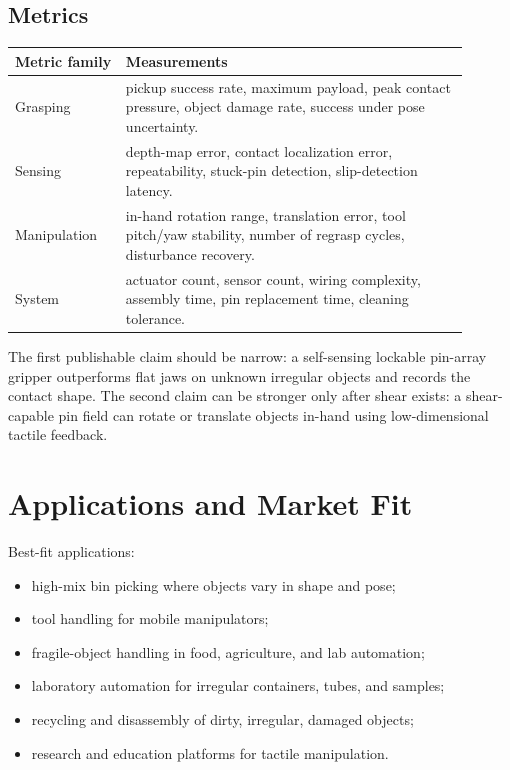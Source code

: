 \documentclass[11pt]{article}
\begin{document}
\subsection{Metrics}

\begin{longtable}{L{0.22\linewidth} L{0.68\linewidth}}
\toprule
\textbf{Metric family} & \textbf{Measurements} \\
\midrule
\endhead
Grasping & pickup success rate, maximum payload, peak contact pressure, object damage rate, success under pose uncertainty. \\
Sensing & depth-map error, contact localization error, repeatability, stuck-pin detection, slip-detection latency. \\
Manipulation & in-hand rotation range, translation error, tool pitch/yaw stability, number of regrasp cycles, disturbance recovery. \\
System & actuator count, sensor count, wiring complexity, assembly time, pin replacement time, cleaning tolerance. \\
\bottomrule
\end{longtable}

The first publishable claim should be narrow: a self-sensing lockable pin-array gripper outperforms flat jaws on unknown irregular objects and records the contact shape. The second claim can be stronger only after shear exists: a shear-capable pin field can rotate or translate objects in-hand using low-dimensional tactile feedback.

\section{Applications and Market Fit}

Best-fit applications:

\begin{itemize}
  \item high-mix bin picking where objects vary in shape and pose;
  \item tool handling for mobile manipulators;
  \item fragile-object handling in food, agriculture, and lab automation;
  \item laboratory automation for irregular containers, tubes, and samples;
  \item recycling and disassembly of dirty, irregular, damaged objects;
  \item research and education platforms for tactile manipulation.
\end{itemize}
\end{document}
